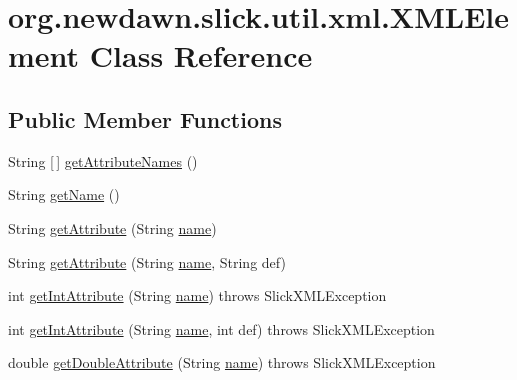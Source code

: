 \hypertarget{classorg_1_1newdawn_1_1slick_1_1util_1_1xml_1_1_x_m_l_element}{}\section{org.\+newdawn.\+slick.\+util.\+xml.\+X\+M\+L\+Element Class Reference}
\label{classorg_1_1newdawn_1_1slick_1_1util_1_1xml_1_1_x_m_l_element}
\subsection*{Public Member Functions}
\begin{DoxyCompactItemize}
\item 
String \mbox{[}$\,$\mbox{]} \mbox{\hyperlink{classorg_1_1newdawn_1_1slick_1_1util_1_1xml_1_1_x_m_l_element_a094548131938fb0ede3ab450846251f9}{get\+Attribute\+Names}} ()
\item 
String \mbox{\hyperlink{classorg_1_1newdawn_1_1slick_1_1util_1_1xml_1_1_x_m_l_element_aae1473c007cf9349735fd0ed60ad7b3a}{get\+Name}} ()
\item 
String \mbox{\hyperlink{classorg_1_1newdawn_1_1slick_1_1util_1_1xml_1_1_x_m_l_element_a49543d209f2f2709c8e7a88fac034c69}{get\+Attribute}} (String \mbox{\hyperlink{classorg_1_1newdawn_1_1slick_1_1util_1_1xml_1_1_x_m_l_element_aa96123a88e2614952c4d3d1a4207560a}{name}})
\item 
String \mbox{\hyperlink{classorg_1_1newdawn_1_1slick_1_1util_1_1xml_1_1_x_m_l_element_ac431b9ebad3625c91ef31361860d88c6}{get\+Attribute}} (String \mbox{\hyperlink{classorg_1_1newdawn_1_1slick_1_1util_1_1xml_1_1_x_m_l_element_aa96123a88e2614952c4d3d1a4207560a}{name}}, String def)
\item 
int \mbox{\hyperlink{classorg_1_1newdawn_1_1slick_1_1util_1_1xml_1_1_x_m_l_element_ad19603eb104b78c62788b058b2f2e2c5}{get\+Int\+Attribute}} (String \mbox{\hyperlink{classorg_1_1newdawn_1_1slick_1_1util_1_1xml_1_1_x_m_l_element_aa96123a88e2614952c4d3d1a4207560a}{name}})  throws Slick\+X\+M\+L\+Exception 
\item 
int \mbox{\hyperlink{classorg_1_1newdawn_1_1slick_1_1util_1_1xml_1_1_x_m_l_element_a57b900455b819890ab599fb2ac526aa9}{get\+Int\+Attribute}} (String \mbox{\hyperlink{classorg_1_1newdawn_1_1slick_1_1util_1_1xml_1_1_x_m_l_element_aa96123a88e2614952c4d3d1a4207560a}{name}}, int def)  throws Slick\+X\+M\+L\+Exception 
\item 
double \mbox{\hyperlink{classorg_1_1newdawn_1_1slick_1_1util_1_1xml_1_1_x_m_l_element_a9815012aef305d3f0247544a681b25b1}{get\+Double\+Attribute}} (String \mbox{\hyperlink{classorg_1_1newdawn_1_1slick_1_1util_1_1xml_1_1_x_m_l_element_aa96123a88e2614952c4d3d1a4207560a}{name}})  throws Slick\+X\+M\+L\+Exception 

\end{DoxyCompactItemize}
